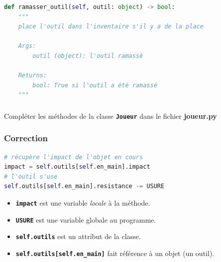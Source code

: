 \documentclass[svgnames,11pt]{beamer}
\begin{document}
\begin{frame}[fragile]
    \frametitle{}

    \begin{center}
    \begin{lstlisting}[language=Python , basicstyle=\small, xleftmargin=2em, xrightmargin=2em]
def ramasser_outil(self, outil: object) -> bool:
    """
    place l'outil dans l'inventaire s'il y a de la place

    Args:
        outil (object): l'outil ramassé

    Returns:
        bool: True si l'outil a été ramassé
    """
\end{lstlisting}
    \label{CODE}
    \end{center}

\end{frame}
\begin{frame}
    \frametitle{}

    \begin{activite}
    Compléter les méthodes de la classe \textbf{\texttt{Joueur}} dans le fichier \textbf{joueur.py}
    \end{activite}

\end{frame}
\begin{frame}[fragile]
    \frametitle{Correction}

    \begin{center}
    \begin{lstlisting}[language=Python , basicstyle=\small, xleftmargin=2em, xrightmargin=2em]
# récupère l'impact de l'objet en cours
impact = self.outils[self.en_main].impact
# l'outil s'use
self.outils[self.en_main].resistance -= USURE
\end{lstlisting}
    \label{CODE}
    \end{center}
\begin{itemize}
    \item \textbf{\texttt{impact}} est une variable \emph{locale} à la méthode.
    \item \textbf{\texttt{USURE}} est une variable globale au programme.
    \item \textbf{\texttt{self.outils}} est un attribut de la classe.
    \item \textbf{\texttt{self.outils[self.en\_main]}} fait référence à un objet (un outil).
\end{itemize}
\end{frame}
\end{document}
